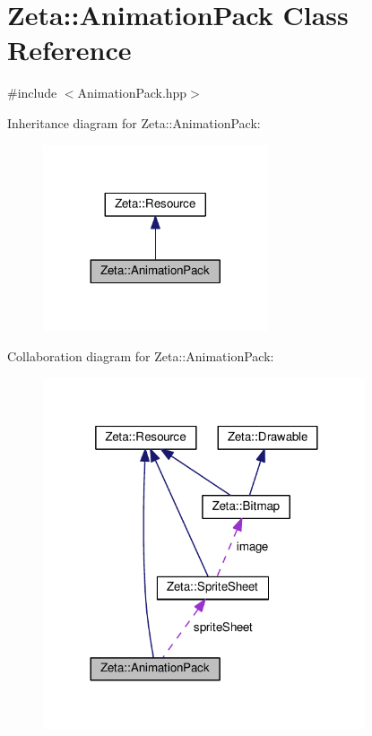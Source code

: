 \hypertarget{classZeta_1_1AnimationPack}{\section{Zeta\+:\+:Animation\+Pack Class Reference}
\label{classZeta_1_1AnimationPack}
}


{\ttfamily \#include $<$Animation\+Pack.\+hpp$>$}



Inheritance diagram for Zeta\+:\+:Animation\+Pack\+:\nopagebreak
\begin{figure}[H]
\begin{center}
\leavevmode
\includegraphics[width=188pt]{classZeta_1_1AnimationPack__inherit__graph}
\end{center}
\end{figure}


Collaboration diagram for Zeta\+:\+:Animation\+Pack\+:
\nopagebreak
\begin{figure}[H]
\begin{center}
\leavevmode
\includegraphics[width=269pt]{classZeta_1_1AnimationPack__coll__graph}
\end{center}
\end{figure}
